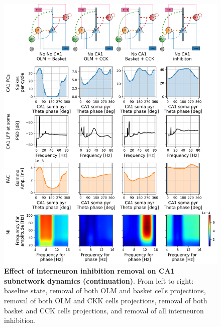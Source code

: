 \documentclass[../main.tex]{subfiles}
\begin{document}
\begin{figure}[htbp]
    \ContinuedFloat %
    \centering
    \includegraphics[width=\textwidth]{chapter4/figures/removing_interneurons/removing_interneurons_ca1_v3_lfp.png}
    \caption{\textbf{Effect of interneuron inhibition removal on CA1 subnetwork dynamics (continuation)}.
    From left to right: baseline state, removal of both OLM and basket cells projections, removal of both OLM and CKK cells projections, removal of both basket and CCK cells projections, and removal of all interneuron inhibition.}
\end{figure}
\end{document}
